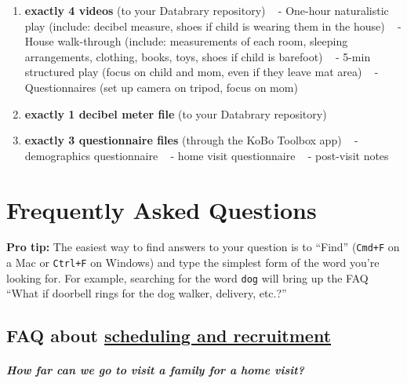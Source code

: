 \documentclass[
  12pt,
]{book}
\providecommand{\tightlist}{%
  \setlength{\itemsep}{0pt}\setlength{\parskip}{0pt}}
\begin{document}
\begin{enumerate}
\def\labelenumi{\arabic{enumi}.}
\tightlist
\item
  \textbf{exactly 4 videos} (to your Databrary repository)
  ~ - One-hour naturalistic play (include: decibel measure, shoes if child is wearing them in the house)
  ~ - House walk-through (include: measurements of each room, sleeping arrangements, clothing, books, toys, shoes if child is barefoot)
  ~ - 5-min structured play (focus on child and mom, even if they leave mat area)
  ~ - Questionnaires (set up camera on tripod, focus on mom)
\item
  \textbf{exactly 1 decibel meter file} (to your Databrary repository)
\item
  \textbf{exactly 3 questionnaire files} (through the KoBo Toolbox app)
  ~ - demographics questionnaire
  ~ - home visit questionnaire
  ~ - post-visit notes
\end{enumerate}

\hypertarget{frequently-asked-questions}{%
\chapter{Frequently Asked Questions}\label{frequently-asked-questions}}

\textbf{Pro tip:} The easiest way to find answers to your question is to ``Find'' (\texttt{Cmd+F} on a Mac or \texttt{Ctrl+F} on Windows) and type the simplest form of the word you're looking for. For example, searching for the word \texttt{dog} will bring up the FAQ ``What if doorbell rings for the dog walker, delivery, etc.?''

\hypertarget{faq-about-scheduling-and-recruitment}{%
\section{\texorpdfstring{FAQ about \protect\hyperlink{scheduling}{scheduling and recruitment}}{FAQ about scheduling and recruitment}}\label{faq-about-scheduling-and-recruitment}}

\hypertarget{how-far-can-we-go-to-visit-a-family-for-a-home-visit}{%
\paragraph*{How far can we go to visit a family for a home visit?}\label{how-far-can-we-go-to-visit-a-family-for-a-home-visit}}
\end{document}

